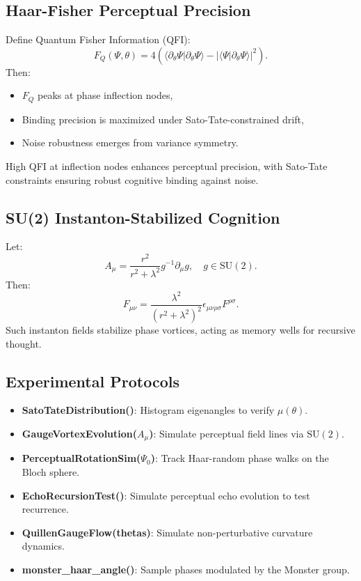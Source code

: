 \documentclass[12pt]{article}
\begin{document}
\subsection{Haar-Fisher Perceptual Precision}
\begin{theorem}
Define Quantum Fisher Information (QFI):
\[
F_Q(\Psi, \theta) = 4 \left( \langle \partial_\theta \Psi | \partial_\theta \Psi \rangle - |\langle \Psi | \partial_\theta \Psi \rangle|^2 \right).
\]
Then:
\begin{itemize}
    \item \( F_Q \) peaks at phase inflection nodes,
    \item Binding precision is maximized under Sato-Tate-constrained drift,
    \item Noise robustness emerges from variance symmetry.
\end{itemize}
\end{theorem}
\begin{interpretation}
High QFI at inflection nodes enhances perceptual precision, with Sato-Tate constraints ensuring robust cognitive binding against noise.
\end{interpretation}

\subsection{SU(2) Instanton-Stabilized Cognition}
\begin{corollary}
Let:
\[
A_\mu = \frac{r^2}{r^2 + \lambda^2} g^{-1} \partial_\mu g, \quad g \in \text{SU}(2).
\]
Then:
\[
F_{\mu\nu} = \frac{\lambda^2}{(r^2 + \lambda^2)^2} \epsilon_{\mu\nu\rho\sigma} F^{\rho\sigma}.
\]
Such instanton fields stabilize phase vortices, acting as memory wells for recursive thought.
\end{corollary}

\subsection{Experimental Protocols}
\begin{itemize}
    \item \textbf{SatoTateDistribution()}: Histogram eigenangles to verify \( \mu(\theta) \).
    \item \textbf{GaugeVortexEvolution($A_\mu$)}: Simulate perceptual field lines via \( \text{SU}(2) \).
    \item \textbf{PerceptualRotationSim($\Psi_0$)}: Track Haar-random phase walks on the Bloch sphere.
    \item \textbf{EchoRecursionTest()}: Simulate perceptual echo evolution to test recurrence.
    \item \textbf{QuillenGaugeFlow(thetas)}: Simulate non-perturbative curvature dynamics.
    \item \textbf{monster\_haar\_angle()}: Sample phases modulated by the Monster group.
\end{itemize}
\end{document}
